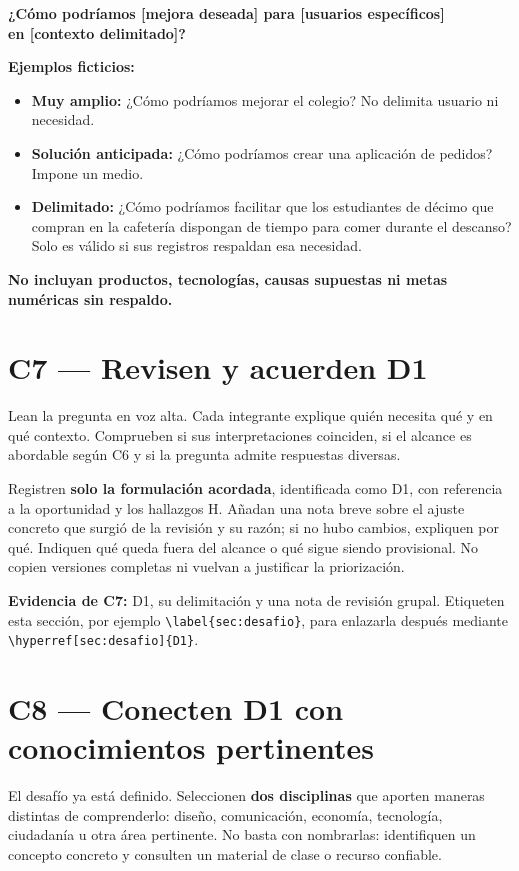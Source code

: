 \documentclass[12pt,a4paper]{article}
\newcommand{\instruction}[1]{\textcolor{InstructionColor}{\textbf{#1}}}
\newcommand{\concept}[1]{\textcolor{ConceptColor}{\textbf{#1}}}
\begin{document}
\begin{center}
\concept{¿Cómo podríamos [mejora deseada] para [usuarios específicos]\\
en [contexto delimitado]?}
\end{center}

\textbf{Ejemplos ficticios:}
\begin{itemize}
\item \textbf{Muy amplio:} ¿Cómo podríamos mejorar el colegio? No delimita usuario ni necesidad.
\item \textbf{Solución anticipada:} ¿Cómo podríamos crear una aplicación de pedidos? Impone un medio.
\item \textbf{Delimitado:} ¿Cómo podríamos facilitar que los estudiantes de décimo que compran en la cafetería dispongan de tiempo para comer durante el descanso? Solo es válido si sus registros respaldan esa necesidad.
\end{itemize}
\instruction{No incluyan productos, tecnologías, causas supuestas ni metas numéricas sin respaldo.}

\section*{C7 --- Revisen y acuerden D1}
Lean la pregunta en voz alta. Cada integrante explique quién necesita qué y en qué contexto. Comprueben si sus interpretaciones coinciden, si el alcance es abordable según C6 y si la pregunta admite respuestas diversas.

Registren \textbf{solo la formulación acordada}, identificada como D1, con referencia a la oportunidad y los hallazgos H. Añadan una nota breve sobre el ajuste concreto que surgió de la revisión y su razón; si no hubo cambios, expliquen por qué. Indiquen qué queda fuera del alcance o qué sigue siendo provisional. No copien versiones completas ni vuelvan a justificar la priorización.

\concept{Evidencia de C7:} D1, su delimitación y una nota de revisión grupal. Etiqueten esta sección, por ejemplo \texttt{\textbackslash label\{sec:desafio\}}, para enlazarla después mediante \texttt{\textbackslash hyperref[sec:desafio]\{D1\}}.

\newpage
\section*{C8 --- Conecten D1 con conocimientos pertinentes}
El desafío ya está definido. Seleccionen \textbf{dos disciplinas} que aporten maneras distintas de comprenderlo: diseño, comunicación, economía, tecnología, ciudadanía u otra área pertinente. No basta con nombrarlas: identifiquen un concepto concreto y consulten un material de clase o recurso confiable.
\end{document}
